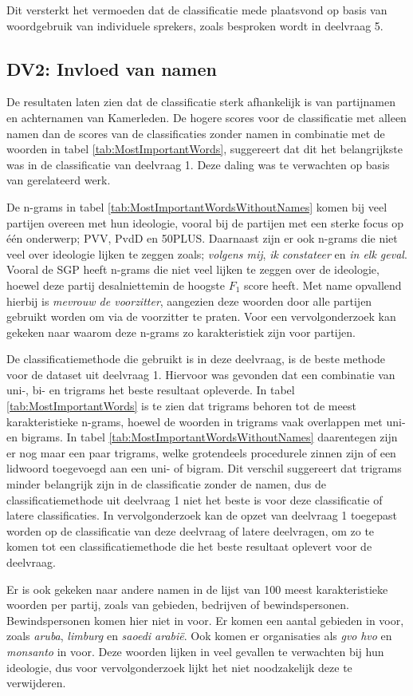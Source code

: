 Dit versterkt het vermoeden dat de classificatie mede plaatsvond op basis van woordgebruik van individuele sprekers, zoals besproken wordt in deelvraag 5.\par


\subsection{DV2: Invloed van namen}
De resultaten laten zien dat de classificatie sterk afhankelijk is van partijnamen en achternamen van Kamerleden. De hogere scores voor de classificatie met alleen namen dan de scores van de classificaties zonder namen in combinatie met de woorden in tabel \ref{tab:MostImportantWords}, suggereert dat dit het belangrijkste was in de classificatie van deelvraag 1. Deze daling was te verwachten op basis van gerelateerd werk.\par
De n-grams in tabel \ref{tab:MostImportantWordsWithoutNames} komen bij veel partijen overeen met hun ideologie, vooral bij de partijen met een sterke focus op één onderwerp; PVV, PvdD en 50PLUS. Daarnaast zijn er ook n-grams die niet veel over ideologie lijken te zeggen zoals; \textit{volgens mij}, \textit{ik constateer} en \textit{in elk geval}. Vooral de SGP heeft n-grams die niet veel lijken te zeggen over de ideologie, hoewel deze partij desalniettemin de hoogste $F_1$ score heeft. Met name opvallend hierbij is \textit{mevrouw de voorzitter}, aangezien deze woorden door alle partijen gebruikt worden om via de voorzitter te praten. Voor een vervolgonderzoek kan gekeken naar waarom deze n-grams zo karakteristiek zijn voor partijen.\par
De classificatiemethode die gebruikt is in deze deelvraag, is de beste methode voor de dataset uit deelvraag 1. Hiervoor was gevonden dat een combinatie van uni-, bi- en trigrams het beste resultaat opleverde. In tabel \ref{tab:MostImportantWords} is te zien dat trigrams behoren tot de meest karakteristieke n-grams, hoewel de woorden in trigrams vaak overlappen met uni- en bigrams. In tabel \ref{tab:MostImportantWordsWithoutNames} daarentegen zijn er nog maar een paar trigrams, welke grotendeels procedurele zinnen zijn of een lidwoord toegevoegd aan een uni- of bigram. Dit verschil suggereert dat trigrams minder belangrijk zijn in de classificatie zonder de namen, dus de classificatiemethode uit deelvraag 1 niet het beste is voor deze classificatie of latere classificaties. In vervolgonderzoek kan de opzet van deelvraag 1 toegepast worden op de classificatie van deze deelvraag of latere deelvragen, om zo te komen tot een classificatiemethode die het beste resultaat oplevert voor de deelvraag.\par
Er is ook gekeken naar andere namen in de lijst van 100 meest karakteristieke woorden per partij, zoals van gebieden, bedrijven of bewindspersonen. Bewindspersonen komen hier niet in voor. Er komen een aantal gebieden in voor, zoals \textit{aruba}, \textit{limburg} en \textit{saoedi arabië}. Ook komen er organisaties als \textit{gvo} \textit{hvo} en \textit{monsanto} in voor. Deze woorden lijken in veel gevallen te verwachten bij hun ideologie, dus voor vervolgonderzoek lijkt het niet noodzakelijk deze te verwijderen.

